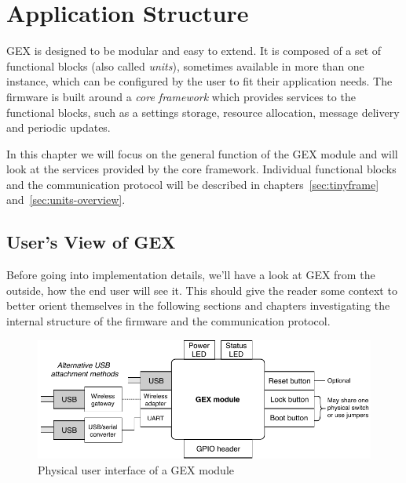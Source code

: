 \chapter{Application Structure}

GEX is designed to be modular and easy to extend. It is composed of a set of functional blocks (also called \textit{units}), sometimes available in more than one instance, which can be configured by the user to fit their application needs. The firmware is built around a \textit{core framework} which provides services to the functional blocks, such as a settings storage, resource allocation, message delivery and periodic updates.

In this chapter we will focus on the general function of the GEX module and will look at the services provided by the core framework. Individual functional blocks and the communication protocol will be described in chapters~\ref{sec:tinyframe} and~\ref{sec:units-overview}.

\section{User's View of GEX}

Before going into implementation details, we'll have a look at GEX from the outside, how the end user will see it. This should give the reader some context to better orient themselves in the following sections and chapters investigating the internal structure of the firmware and the communication protocol.

\begin{figure}[h]
	\centering
	\includegraphics[scale=.95] {img/users-view.pdf}
	\caption{\label{fig:users-view-of-gex}Physical user interface of a GEX module}
\end{figure}

